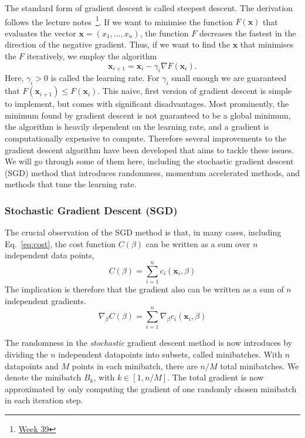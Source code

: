 \documentclass[a4paper,
amsfonts,
amssymb,
amsmath,
reprint,
showkeys,
nofootinbib,
twoside]{revtex4-2}
\begin{document}
The standard form of gradient descent is called steepest descent. The derivation follows the lecture notes~\footnote{\href{https://compphysics.github.io/MachineLearning/doc/pub/week39/html/week39.html}{Week 39}}. If we want to minimise the function $F(\bm{x})$ that evaluates the vector $\bm{x} = (x_1, ... , x_n)$, the function $F$ decreases the fastest in the direction of the negative gradient. Thus, if we want to find the $\bm{x}$ that minimises the $F$ iteratively, we employ the algorithm
\begin{equation}
    \bm{x}_{i+1} = \bm{x}_i - \gamma_{i}\nabla F(\bm{x}_i).
\end{equation}
Here, $\gamma_i > 0$ is called the learning rate. For $\gamma_i$ small enough we are guaranteed that $F(\bm{x}_{i+1}) \leq F(\bm{x}_{i})$. This naive, first version of gradient descent is simple to implement, but comes with significant disadvantages. Most prominently, the minimum found by gradient descent is not guaranteed to be a global minimum, the algorithm is heavily dependent on the learning rate, and a gradient is computationally expensive to compute. Therefore several improvements to the gradient descent algorithm have been developed that aims to tackle these issues. We will go through some of them here, including the stochastic gradient descent (SGD) method that introduces randomness, momentum accelerated methods, and methods that tune the learning rate.

\subsubsection{Stochastic Gradient Descent (SGD)}

The crucial observation of the SGD method is that, in many cases, including Eq.~\eqref{eq:cost}, the cost function $C(\beta)$ can be written as a sum over $n$ independent data points,
\begin{equation}
    C(\beta) = \sum_{i = 1}^n c_i(\bm{x}_i, \beta)
\end{equation}
The implication is therefore that the gradient also can be written as a sum of $n$ independent gradients.
\begin{equation}
    \nabla_{\beta} C(\beta) =  \sum_{i = 1}^n \nabla_{\beta}c_i(\bm{x}_i, \beta)
\end{equation}

The randomness in the \textit{stochastic} gradient descent method is now introduces by dividing the $n$ independent datapoints into subsets, called minibatches. With $n$ datapoints and $M$ points in each minibatch, there are $n/M$ total minibatches. We denote the minibatch $B_k$, with $k \in [1, n/M]$. The total gradient is now approximated by only computing the gradient of one randomly chosen minibatch in each iteration step.
\end{document}
